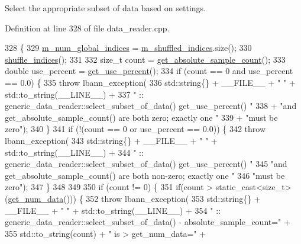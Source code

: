 Select the appropriate subset of data based on settings. 

Definition at line 328 of file data\+\_\+reader.\+cpp.


\begin{DoxyCode}
328                                                 \{
329   \hyperlink{classlbann_1_1generic__data__reader_ac6ea8dad1e9f0a8c939fd27d2de37e1b}{m\_num\_global\_indices} = \hyperlink{classlbann_1_1generic__data__reader_aaab6aeff67ffff1c689336851fec2c57}{m\_shuffled\_indices}.size();
330   \hyperlink{classlbann_1_1generic__data__reader_af1aaa4d1a693974c1b1f1318b6ed60b8}{shuffle\_indices}();
331 
332   \textcolor{keywordtype}{size\_t} count = \hyperlink{classlbann_1_1generic__data__reader_a1e8655cd1883d850566694bcf2ad60ab}{get\_absolute\_sample\_count}();
333   \textcolor{keywordtype}{double} use\_percent = \hyperlink{classlbann_1_1generic__data__reader_a5853fa5e619b886699954aca6440dd8a}{get\_use\_percent}();
334   \textcolor{keywordflow}{if} (count == 0 and use\_percent == 0.0) \{
335       \textcolor{keywordflow}{throw} lbann\_exception(
336         std::string\{\} + \_\_FILE\_\_ + \textcolor{stringliteral}{" "} + std::to\_string(\_\_LINE\_\_) +
337         \textcolor{stringliteral}{" :: generic\_data\_reader::select\_subset\_of\_data() get\_use\_percent() "}
338         + \textcolor{stringliteral}{"and get\_absolute\_sample\_count() are both zero; exactly one "}
339         + \textcolor{stringliteral}{"must be zero"});
340   \}
341   \textcolor{keywordflow}{if} (!(count == 0 or use\_percent == 0.0)) \{
342       \textcolor{keywordflow}{throw} lbann\_exception(
343         std::string\{\} + \_\_FILE\_\_ + \textcolor{stringliteral}{" "} + std::to\_string(\_\_LINE\_\_) +
344         \textcolor{stringliteral}{" :: generic\_data\_reader::select\_subset\_of\_data() get\_use\_percent() "}
345         \textcolor{stringliteral}{"and get\_absolute\_sample\_count() are both non-zero; exactly one "}
346         \textcolor{stringliteral}{"must be zero"});
347   \}
348 
349 
350   \textcolor{keywordflow}{if} (count != 0) \{
351     \textcolor{keywordflow}{if}(count > static\_cast<size\_t>(\hyperlink{classlbann_1_1generic__data__reader_adcdb833aff7ce85b0879334b252f357a}{get\_num\_data}())) \{
352       \textcolor{keywordflow}{throw} lbann\_exception(
353         std::string\{\} + \_\_FILE\_\_ + \textcolor{stringliteral}{" "} + std::to\_string(\_\_LINE\_\_) +
354         \textcolor{stringliteral}{" :: generic\_data\_reader::select\_subset\_of\_data() - absolute\_sample\_count="} +
355         std::to\_string(count) + \textcolor{stringliteral}{" is > get\_num\_data="} +

\end{DoxyCode}
